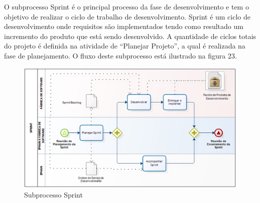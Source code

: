 \begin{anexosenv}
O subprocesso Sprint é o principal processo da fase de desenvolvimento e tem o objetivo de realizar o ciclo de trabalho de desenvolvimento. Sprint é um ciclo de desenvolvimento onde requisitos são implementados tendo como resultado um incremento do produto que está sendo desenvolvido. A quantidade de ciclos totais do projeto é definida na atividade de “Planejar Projeto”, a qual é realizada na fase de planejamento. O fluxo deste subprocesso está ilustrado na figura 23.


\begin{figure}[H]
		\centering
		\label{fig01}
			\includegraphics[scale=0.4]{figuras/subprocessoSprint.png}
		\caption{Subprocesso Sprint \cite{IPHAN:2013}}
\end{figure}

\end{anexosenv}


